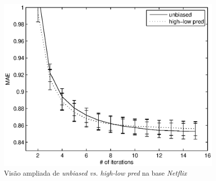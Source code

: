 \begin{figure}[ht]
\centering
\includegraphics{nf_focus_highlow_unbiased.eps}
\caption{Visão ampliada de \textit{unbiased vs. high-low pred} na base \textit{Netflix}}
\label{fig:unbiased-highlowpred-focus-netflix}
\end{figure}